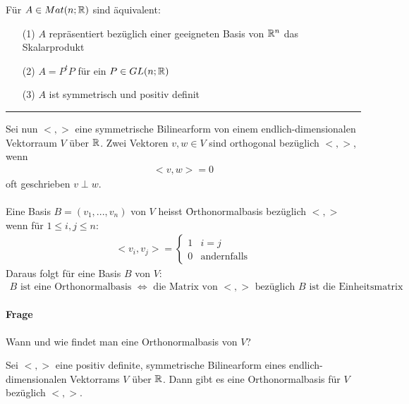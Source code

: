 \begin{satz} %
\label{satz513}
Für $A \in Mat(n; \mathbb{R})$ sind äquivalent:
\begin{itemize}
\item[(1)] $A$ repräsentiert bezüglich einer geeigneten Basis von $\mathbb{R}^n$ das Skalarprodukt
\item[(2)] $A = P^t P$ für ein $P \in GL(n; \mathbb{R})$
\item[(3)] $A$ ist symmetrisch und positiv definit
\end{itemize}
\end{satz}
\vspace*{0.2cm} \rule{\linewidth}{0.3mm}\vspace*{0.1cm}
Sei nun $<, >$ eine symmetrische Bilinearform von einem endlich-dimensionalen \\Vektorraum $V$ über $\mathbb{R}$. Zwei Vektoren $v, w \in V$ sind orthogonal bezüglich $<, >$, wenn
\begin{align}
<v, w> = 0
\end{align}
oft geschrieben $v \perp w$. \\\\
Eine Basis $B = (v_1, ..., v_n)$ von $V$ heisst \f{Orthonormalbasis} bezüglich $<, >$ wenn für $1 \leq i, j \leq n$:
\begin{align}
<v_i, v_j> = \left \{ \begin{matrix} 1 & i=j \\ 0 & \text{andernfalls} \end{matrix} \right.
\end{align}
Daraus folgt für eine Basis $B$ von $V$:
\begin{align}
\text{$B$ ist eine Orthonormalbasis } \Leftrightarrow \text{ die Matrix von $<, >$ bezüglich $B$ ist die Einheitsmatrix}
\end{align}

\paragraph{Frage} Wann und wie findet man eine Orthonormalbasis von $V$?

\begin{satz} %
\label{satz514}
Sei $<, >$ eine positiv definite, symmetrische Bilinearform eines endlich-dimensionalen Vektorrams $V$ über $\mathbb{R}$. Dann gibt es eine Orthonormalbasis für $V$ bezüglich $<, >$.
\end{satz}

